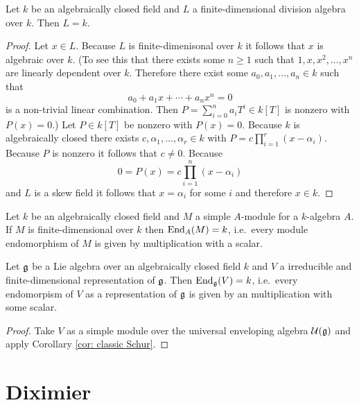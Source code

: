 \begin{lem}
 Let $k$ be an algebraically closed field and $L$ a finite-dimensional division algebra over $k$. Then $L = k$.
\end{lem}
\begin{proof}
 Let $x \in L$. Because $L$ is finite-dimenisonal over $k$ it follows that $x$ is algebraic over $k$. (To see this that there exists some $n \geq 1$ such that $1, x, x^2, \dotsc, x^n$ are linearly dependent over $k$. Therefore there exist some $a_0, a_1, \dotsc, a_n \in k$ such that
 \[
  a_0 + a_1 x + \dotsb + a_n x^n = 0
 \]
 is a non-trivial linear combination. Then $P = \sum_{i=0}^n a_i T^i \in k[T]$ is nonzero with $P(x) = 0$.) Let $P \in k[T]$ be nonzero with $P(x) = 0$. Because $k$ is algebraically closed there exists $c, \alpha_1, \dotsc, \alpha_r \in k$ with $P = c \prod_{i=1}^r (x-\alpha_i)$. Because $P$ is nonzero it follows that $c \neq 0$. Because
 \[
  0 = P(x) = c \prod_{i=1}^n (x-\alpha_i)
 \]
 and $L$ is a skew field it follows that $x = \alpha_i$ for some $i$ and therefore $x \in k$.
\end{proof}


\begin{cor}[Schur] \label{cor: classic Schur}
 Let $k$ be an algebraically closed field and $M$ a simple $A$-module for a $k$-algebra $A$. If $M$ is finite-dimensional over $k$ then $\operatorname{End}_A(M) = k$, i.e.\ every module endomorphism of $M$ is given by multiplication with a scalar.
\end{cor}


\begin{cor}
 Let $\mathfrak{g}$ be a Lie algebra over an algebraically closed field $k$ and $V$ a irreducible and finite-dimensional representation of $\mathfrak{g}$. Then $\operatorname{End}_{\mathfrak{g}}(V) = k$, i.e.\ every endomorpism of $V$ as a representation of $\mathfrak{g}$ is given by an multiplication with some scalar.
\end{cor}
\begin{proof}
 Take $V$ as a simple module over the universal enveloping algebra $\mathcal{U}(\mathfrak{g})$ and apply Corollary \ref{cor: classic Schur}.
\end{proof}





\section{Diximier}


























